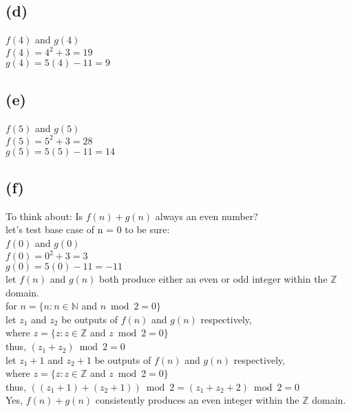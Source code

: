 \documentclass[11pt]{article}
\begin{document}
\subsection*{(d)}
\begin{center}
$f(4)$ and $g(4)$\\
$f(4) = 4^{2} + 3 = 19$\\
$g(4) = 5(4) - 11 = 9$\\
\end{center}

\subsection*{(e)}
\begin{center}
$f(5)$ and $g(5)$\\
$f(5) = 5^{2} + 3 = 28$\\
$g(5) = 5(5) - 11 = 14$\\
\end{center}

\subsection*{(f)}
\begin{center}
To think about: Is $f(n) + g(n)$ always an even number?\\
\hfill \break
let's test base case of n = 0 to be sure:\\
$f(0)$ and $g(0)$\\
$f(0) = 0^{2} + 3 = 3$\\
$g(0) = 5(0) - 11 = -11$\\
\hfill \break
let $f(n)$ and $g(n)$ both produce either an even or odd integer within the $\mathbb{Z}$ domain.\\
for $n = \{n: n \in \mathbb{N}$ and $n \bmod 2 = 0\}$\\
let $z_{1}$ and $z_{2}$ be outputs of $f(n)$ and $g(n)$ respectively,\\
where $z = \{z: z \in \mathbb{Z}$ and $z \bmod 2 = 0\}$\\
thus, $(z_{1} + z_{2}) \bmod 2 = 0$\\
\hfill \break
let $z_{1}+1$ and $z_{2}+1$ be outputs of $f(n)$ and $g(n)$ respectively,\\
where $z = \{z: z \in \mathbb{Z}$ and $z \bmod 2 = 0\}$\\
thus, $((z_{1} + 1) + (z_{2} + 1)) \bmod 2 = (z_{1} + z_{2} + 2) \bmod 2 = 0$\\
\hfill \break
Yes, $f(n) + g(n)$ consistently produces an even integer within the $\mathbb{Z}$ domain.\\
\end{center}
%
%
\end{document}
